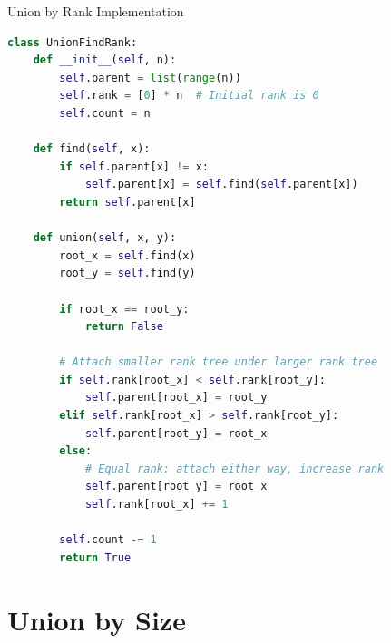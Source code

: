 \documentclass[aspectratio=169]{beamer}
\begin{document}
\begin{frame}[fragile]{Union by Rank Implementation}
  \begin{lstlisting}[language=Python, basicstyle=\ttfamily\footnotesize]
class UnionFindRank:
    def __init__(self, n):
        self.parent = list(range(n))
        self.rank = [0] * n  # Initial rank is 0
        self.count = n

    def find(self, x):
        if self.parent[x] != x:
            self.parent[x] = self.find(self.parent[x])
        return self.parent[x]

    def union(self, x, y):
        root_x = self.find(x)
        root_y = self.find(y)

        if root_x == root_y:
            return False

        # Attach smaller rank tree under larger rank tree
        if self.rank[root_x] < self.rank[root_y]:
            self.parent[root_x] = root_y
        elif self.rank[root_x] > self.rank[root_y]:
            self.parent[root_y] = root_x
        else:
            # Equal rank: attach either way, increase rank
            self.parent[root_y] = root_x
            self.rank[root_x] += 1

        self.count -= 1
        return True
  \end{lstlisting}
\end{frame}

\section{Union by Size}
\end{document}

